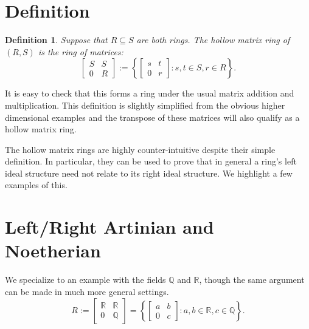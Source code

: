 \documentclass[12pt]{article}
\newtheorem{defn}[thm]{Definition}
\begin{document}
\section{Definition}

\begin{defn}
Suppose that $R\subseteq S$ are both rings.  The \emph{hollow matrix ring} of $(R,S)$ 
is the ring of matrices:
\begin{equation*}
\begin{bmatrix} S & S \\ 0 & R\end{bmatrix} :=\left\{
\begin{bmatrix} s & t \\ 0 & r\end{bmatrix} : s,t\in S, r\in R\right\}.
\end{equation*}
\end{defn}
It is easy to check that this forms a ring under the usual matrix addition and
multiplication.
This definition is slightly simplified from the obvious higher dimensional examples
and the transpose of these matrices will also qualify as a hollow matrix ring.

The hollow matrix rings are highly counter-intuitive despite their simple definition.
In particular, they can be used to prove that in general a ring's left ideal
structure need not relate to its right ideal structure.  We highlight a few
examples of this.


\section{Left/Right Artinian and Noetherian}

We specialize to an example with the fields $\mathbb{Q}$ and $\mathbb{R}$, though
the same argument can be made in much more general settings.
\begin{equation}
  R := \begin{bmatrix} \mathbb{R} & \mathbb{R}\\ 0 & \mathbb{Q}\end{bmatrix}
     = \left\{\begin{bmatrix} a & b \\ 0 & c\end{bmatrix} : a,b\in \mathbb{R}, c\in\mathbb{Q}\right\}.
\end{equation}
\end{document}
